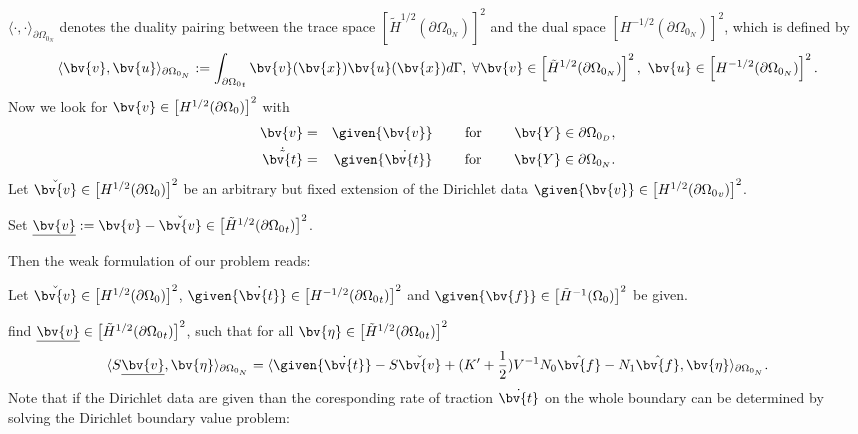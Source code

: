 $ \langle \cdot,\cdot\rangle_{\partial{\Omega_{0_N}}} $ denotes the duality pairing between the trace space  $\left[ \tilde{H}^{1/2}(\partial{\Omega_{0_N}})\right] ^{2}$ and the dual space $\left[ H^{-1/2}(\partial{\Omega_{0_N}})\right] ^{2}$, which is defined by
\begin{equation}
\langle \bv{v},\bv{u}\rangle_{\partial{\Omega_{0_N}}}  := \int_{\partial{\Omega_0}_{t}}\bv{v}(\bv{x})\bv{u}(\bv{x})d \Gamma, \; \forall \bv{v} \in \left[ \tilde{H}^{1/2}(\partial{\Omega_{0_N}})\right] ^{2}, ~\bv{u} \in\left[ H^{-1/2}(\partial{\Omega_{0_N}})\right] ^{2}. \nonumber
\end{equation}
Now we look for  $\bv{v}\in \left[ H^{1/2}(\partial{\Omega_0})\right] ^{2}$ with
\begin{eqnarray}
\bv{v}&=&\given{\bv{v}} \qquad \textnormal{ for }\qquad \bv{Y}\in\partial{\Omega_{0_D}},\nonumber\\
\dot{\tilde{\bv{t}}}&=&\given{\dot{\bv{t}}}\qquad \textnormal{ for }\qquad \bv{Y}\in\partial{\Omega_{0_N}}.\nonumber
\end{eqnarray} 
Let $\check{\bv{v}}\in \left[ H^{1/2}(\partial{\Omega_0})\right] ^{2}$ be an arbitrary but fixed extension of the Dirichlet data  $\given{\bv{v}}\in \left[ H^{1/2}(\partial{\Omega_0}_{v})\right] ^{2}$.

Set $\underline{\bv{v}}:=\bv{v}-\check{\bv{v}}\in \left[ \tilde{H}^{1/2}(\partial{\Omega_0}_{t})\right] ^{2}$. 

Then the weak formulation of our problem reads:

Let $\check{\bv{v}}\in \left[ H^{1/2}(\partial{\Omega_0})\right] ^{2}$, $\given{\dot{\bv{t}}}\in \left[ H^{-1/2}(\partial{\Omega_0}_{t})\right] ^{2}$ and  $\given{\bv{f}}\in \left[ \tilde{H}^{-1}({\Omega_0})\right] ^{2}$ be given.

find $\underline{\bv{v}}\in \left[\tilde{ H}^{1/2}(\partial{\Omega_0}_{t})\right] ^{2}$, such that \hspace{4pt} for all $ \bv{\eta}\in \left[ \tilde{H}^{1/2}(\partial{\Omega_0}_{t})\right]^{2}$
\begin{equation}
\langle S\underline{\bv{v}},\bv{\eta}\rangle_{\partial{\Omega_{0_N}}}=\langle \given{\dot{\bv{t}}}-S\check{\bv{v}}+(K'+\frac{1}{2})V^{-1}N_{0}\hat{\bv{f}}-N_{1}\hat{\bv{f}},\bv{\eta}\rangle_{\partial{\Omega_{0_N}}}.
\end{equation} 
Note that if the Dirichlet data are given than the coresponding rate of traction $\dot{\bv{t}}$ on the whole boundary   can be determined by solving the Dirichlet boundary value problem: 


